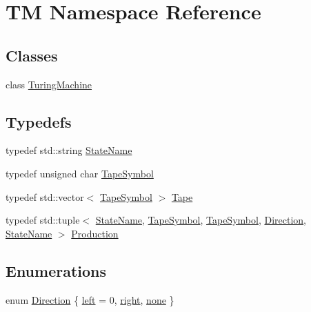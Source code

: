 \hypertarget{namespaceTM}{\section{\-T\-M \-Namespace \-Reference}
\label{d6/d65/namespaceTM}
}
\subsection*{\-Classes}
\begin{DoxyCompactItemize}
\item 
class \hyperlink{classTM_1_1TuringMachine}{\-Turing\-Machine}
\end{DoxyCompactItemize}
\subsection*{\-Typedefs}
\begin{DoxyCompactItemize}
\item 
typedef std\-::string \hyperlink{namespaceTM_a852554502c474841ede5736b807839ff}{\-State\-Name}
\item 
typedef unsigned char \hyperlink{namespaceTM_af53c0529f78dfcdeb19c450abbd44cf6}{\-Tape\-Symbol}
\item 
typedef std\-::vector$<$ \hyperlink{namespaceTM_af53c0529f78dfcdeb19c450abbd44cf6}{\-Tape\-Symbol} $>$ \hyperlink{namespaceTM_a20b31cfe7d86b00db299e72ad48f70af}{\-Tape}
\item 
typedef std\-::tuple$<$ \hyperlink{namespaceTM_a852554502c474841ede5736b807839ff}{\-State\-Name}, \*
\hyperlink{namespaceTM_af53c0529f78dfcdeb19c450abbd44cf6}{\-Tape\-Symbol}, \hyperlink{namespaceTM_af53c0529f78dfcdeb19c450abbd44cf6}{\-Tape\-Symbol}, \*
\hyperlink{namespaceTM_a7c40dddb5b66504639e0d378ec13792d}{\-Direction}, \hyperlink{namespaceTM_a852554502c474841ede5736b807839ff}{\-State\-Name} $>$ \hyperlink{namespaceTM_a87460339f40338ea4e37433443965554}{\-Production}
\end{DoxyCompactItemize}
\subsection*{\-Enumerations}
\begin{DoxyCompactItemize}
\item 
enum \hyperlink{namespaceTM_a7c40dddb5b66504639e0d378ec13792d}{\-Direction} \{ \hyperlink{namespaceTM_a7c40dddb5b66504639e0d378ec13792dac3682a7842c29b64f35ecbeb70fafb7f}{left} =  0, 
\hyperlink{namespaceTM_a7c40dddb5b66504639e0d378ec13792da7524c80fbbe2893a839a75c97def5911}{right}, 
\hyperlink{namespaceTM_a7c40dddb5b66504639e0d378ec13792dabf7f6892ad2d17d8e27921834d7c3ee2}{none}
 \}
\end{DoxyCompactItemize}


